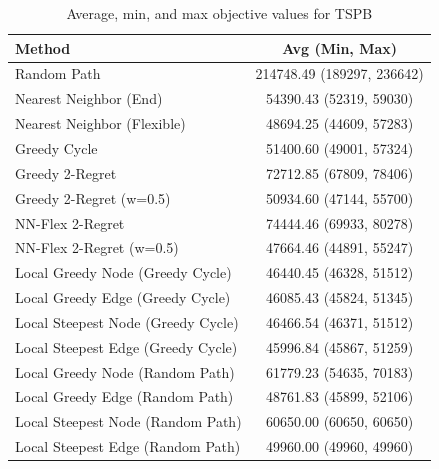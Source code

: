 \begin{table}[h!]
\centering
\begin{tabular}{lc}
\hline
Method & Avg (Min, Max) \\
\hline
Random Path & 214748.49 (189297, 236642) \\
Nearest Neighbor (End) & 54390.43 (52319, 59030) \\
Nearest Neighbor (Flexible) & 48694.25 (44609, 57283) \\
Greedy Cycle & 51400.60 (49001, 57324) \\
Greedy 2-Regret & 72712.85 (67809, 78406) \\
Greedy 2-Regret (w=0.5) & 50934.60 (47144, 55700) \\
NN-Flex 2-Regret & 74444.46 (69933, 80278) \\
NN-Flex 2-Regret (w=0.5) & 47664.46 (44891, 55247) \\
Local Greedy Node (Greedy Cycle) & 46440.45 (46328, 51512) \\
Local Greedy Edge (Greedy Cycle) & 46085.43 (45824, 51345) \\
Local Steepest Node (Greedy Cycle) & 46466.54 (46371, 51512) \\
Local Steepest Edge (Greedy Cycle) & 45996.84 (45867, 51259) \\
Local Greedy Node (Random Path) & 61779.23 (54635, 70183) \\
Local Greedy Edge (Random Path) & 48761.83 (45899, 52106) \\
Local Steepest Node (Random Path) & 60650.00 (60650, 60650) \\
Local Steepest Edge (Random Path) & 49960.00 (49960, 49960) \\
\hline
\end{tabular}
\caption{Average, min, and max objective values for TSPB}
\label{tab:TSPB_scores}
\end{table}
